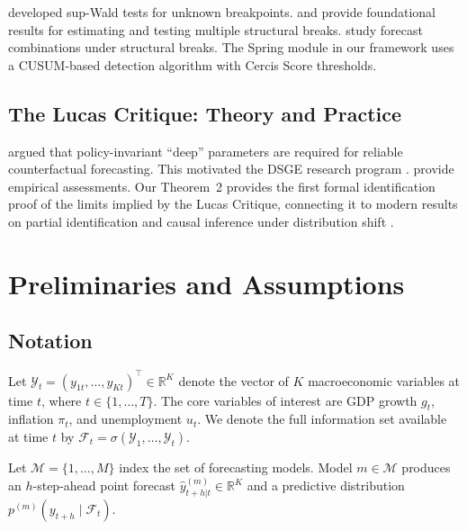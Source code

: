 \documentclass[12pt,a4paper]{article}
\begin{document}
\citet{andrews1993tests} developed sup-Wald tests for unknown breakpoints.
\citet{bai1998estimation} and \citet{bai2003computation} provide
foundational results for estimating and testing multiple structural breaks.
\citet{giordani2007forecasting} study forecast combinations under
structural breaks.  The Spring module in our framework uses a CUSUM-based
detection algorithm with Cercis Score thresholds.

\subsection{The Lucas Critique: Theory and Practice}

\citet{lucas1976econometric} argued that policy-invariant ``deep''
parameters are required for reliable counterfactual forecasting.  This
motivated the DSGE research program \citep{woodford2003interest}.
\citet{favero2005 Lucas} provide empirical assessments.  Our Theorem~2
provides the first formal identification proof of the limits implied
by the Lucas Critique, connecting it to modern results on partial
identification \citep{manski2003partial} and causal inference under
distribution shift \citep{peters2017elements}.

\section{Preliminaries and Assumptions}
\label{sec:prelim}

\subsection{Notation}

Let $\mathcal{Y}_t = (y_{1t}, \ldots, y_{Kt})^\top \in \mathbb{R}^K$ denote
the vector of $K$ macroeconomic variables at time $t$, where $t \in
\{1, \ldots, T\}$.  The core variables of interest are GDP growth $g_t$,
inflation $\pi_t$, and unemployment $u_t$.  We denote the full information
set available at time $t$ by $\mathcal{F}_t = \sigma(\mathcal{Y}_1, \ldots,
\mathcal{Y}_t)$.

Let $\mathcal{M} = \{1, \ldots, M\}$ index the set of forecasting models.
Model $m \in \mathcal{M}$ produces an $h$-step-ahead point forecast
$\hat{y}_{t+h|t}^{(m)} \in \mathbb{R}^K$ and a predictive distribution
$p^{(m)}(y_{t+h} \mid \mathcal{F}_t)$.
\end{document}
